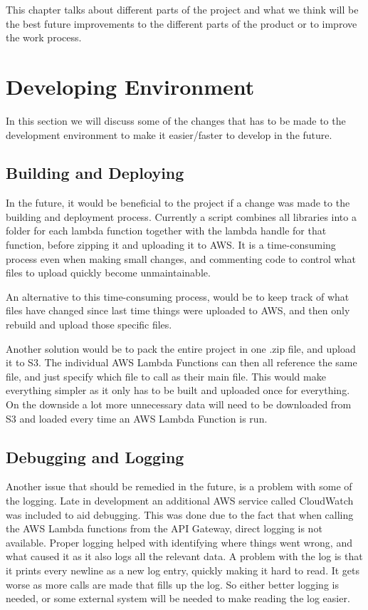 This chapter talks about different parts of the project and what we think will be the best future improvements to the different parts of the product or to improve the work process.

\section{Developing Environment}
In this section we will discuss some of the changes that has to be made to the development environment to make it easier/faster to develop in the future.

\subsection{Building and Deploying}
In the future, it would be beneficial to the project if a change was made to the building and deployment process. Currently a script combines all libraries into a folder for each lambda function together with the lambda handle for that function, before zipping it and uploading it to AWS. It is a time-consuming process even when making small changes, and commenting code to control what files to upload quickly become unmaintainable. 

An alternative to this time-consuming process, would be to keep track of what files have changed since last time things were uploaded to AWS, and then only rebuild and upload those specific files.

Another solution would be to pack the entire project in one .zip file, and upload it to S3. The individual AWS Lambda Functions can then all reference the same file, and just specify which file to call as their main file. This would make everything simpler as it only has to be built and uploaded once for everything. On the downside a lot more unnecessary data will need to be downloaded from S3 and loaded every time an AWS Lambda Function is run.

\subsection{Debugging and Logging}
Another issue that should be remedied in the future, is a problem with some of the logging.
Late in development an additional AWS service called CloudWatch was included to aid debugging. This was done due to the fact that when calling the AWS Lambda functions from the API Gateway, direct logging is not available. Proper logging helped with identifying where things went wrong, and what caused it as it also logs all the relevant data.
A problem with the log is that it prints every newline as a new log entry, quickly making it hard to read. It gets worse as more calls are made that fills up the log.
So either better logging is needed, or some external system will be needed to make reading the log easier.

